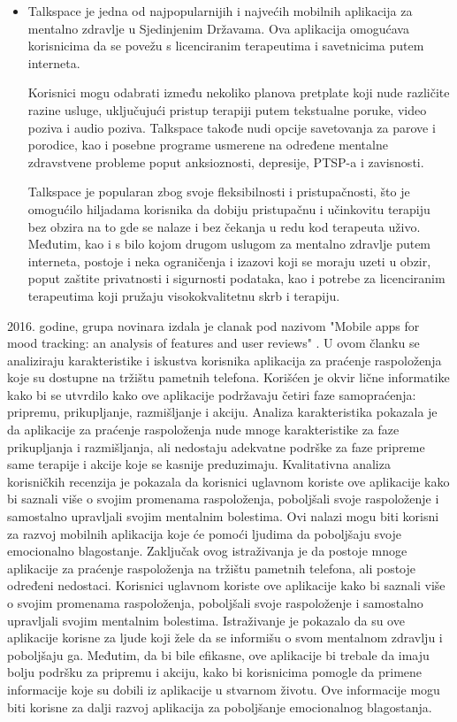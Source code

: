 \documentclass[a4paper]{article}
\begin{document}
\begin{itemize}
\item Talkspace\cite{treca} je jedna od najpopularnijih i najvećih mobilnih aplikacija za mentalno zdravlje u Sjedinjenim Državama. Ova aplikacija omogućava korisnicima da se povežu s licenciranim terapeutima i savetnicima putem interneta.

Korisnici mogu odabrati između nekoliko planova pretplate koji nude različite razine usluge, uključujući pristup terapiji putem tekstualne poruke, video poziva i audio poziva. Talkspace takođe nudi opcije savetovanja za parove i porodice, kao i posebne programe usmerene na određene mentalne zdravstvene probleme poput anksioznosti, depresije, PTSP-a i zavisnosti.

Talkspace je popularan zbog svoje fleksibilnosti i pristupačnosti, što je omogućilo hiljadama korisnika da dobiju pristupačnu i učinkovitu terapiju bez obzira na to gde se nalaze i bez čekanja u redu kod terapeuta uživo. Međutim, kao i s bilo kojom drugom uslugom za mentalno zdravlje putem interneta, postoje i neka ograničenja i izazovi koji se moraju uzeti u obzir, poput zaštite privatnosti i sigurnosti podataka, kao i potrebe za licenciranim terapeutima koji pružaju visokokvalitetnu skrb i terapiju.

\end{itemize}

2016. godine, grupa novinara izdala je clanak pod nazivom "Mobile apps for mood tracking: an analysis of features and user reviews" \cite{cetvrta}. U ovom članku se analiziraju karakteristike i iskustva korisnika aplikacija za praćenje raspoloženja koje su dostupne na tržištu pametnih telefona. Korišćen je okvir lične informatike kako bi se utvrdilo kako ove aplikacije podržavaju četiri faze samopraćenja: pripremu, prikupljanje, razmišljanje i akciju. Analiza karakteristika pokazala je da aplikacije za praćenje raspoloženja nude mnoge karakteristike za faze prikupljanja i razmišljanja, ali nedostaju adekvatne podrške za faze pripreme same terapije i akcije koje se kasnije preduzimaju. Kvalitativna analiza korisničkih recenzija je pokazala da korisnici uglavnom koriste ove aplikacije kako bi saznali više o svojim promenama raspoloženja, poboljšali svoje raspoloženje i samostalno upravljali svojim mentalnim bolestima. Ovi nalazi mogu biti korisni za razvoj mobilnih aplikacija koje će pomoći ljudima da poboljšaju svoje emocionalno blagostanje.
Zaključak ovog istraživanja je da postoje mnoge aplikacije za praćenje raspoloženja na tržištu pametnih telefona, ali postoje određeni nedostaci. Korisnici uglavnom koriste ove aplikacije kako bi saznali više o svojim promenama raspoloženja, poboljšali svoje raspoloženje i samostalno upravljali svojim mentalnim bolestima.
Istraživanje je pokazalo da su ove aplikacije korisne za ljude koji žele da se informišu o svom mentalnom zdravlju i poboljšaju ga. Međutim, da bi bile efikasne, ove aplikacije bi trebale da imaju bolju podršku za pripremu i akciju, kako bi korisnicima pomogle da primene informacije koje su dobili iz aplikacije u stvarnom životu. Ove informacije mogu biti korisne za dalji razvoj aplikacija za poboljšanje emocionalnog blagostanja.
\end{document}
